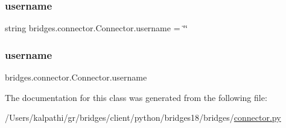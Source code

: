 \subsubsection{\texorpdfstring{username}{username}\hspace{0.1cm}{\footnotesize\ttfamily [1/2]}}
{\footnotesize\ttfamily string bridges.\+connector.\+Connector.\+username = \char`\"{}\char`\"{}\hspace{0.3cm}{\ttfamily [static]}}

\mbox{\label{classbridges_1_1connector_1_1_connector_adeb8d1b493eae70c24127fb175e1bfe7}} 
\subsubsection{\texorpdfstring{username}{username}\hspace{0.1cm}{\footnotesize\ttfamily [2/2]}}
{\footnotesize\ttfamily bridges.\+connector.\+Connector.\+username}



The documentation for this class was generated from the following file\+:\begin{DoxyCompactItemize}
\item 
/\+Users/kalpathi/gr/bridges/client/python/bridges18/bridges/\mbox{\hyperlink{connector_8py}{connector.\+py}}\end{DoxyCompactItemize}
